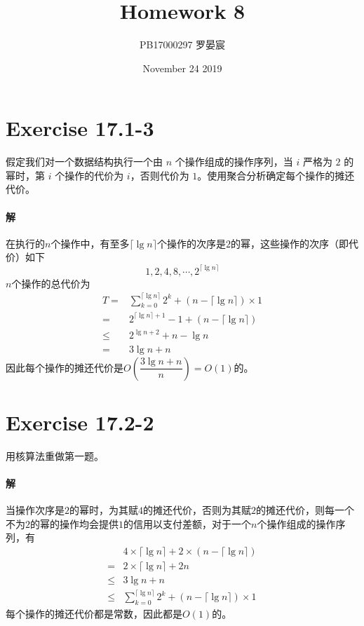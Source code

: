 \documentclass{article}
\title{Homework 8}
\author{PB17000297 罗晏宸}
\date{November 24 2019}
\begin{document}
\maketitle

\section{Exercise 17.1-3}
假定我们对一个数据结构执行一个由 $n$ 个操作组成的操作序列，当 $i$ 严格为 $2$ 的幂时，第 $i$ 个操作的代价为 $i$，否则代价为 $1$。使用聚合分析确定每个操作的摊还代价。

\paragraph{解}
在执行的$n$个操作中，有至多$\lceil \lg{n} \rceil$个操作的次序是$2$的幂，这些操作的次序（即代价）如下
\begin{equation*}
	1, 2, 4, 8, \cdots , 2^{\lceil \lg{n} \rceil}
\end{equation*}
$n$个操作的总代价为
\begin{align*}
	T =& \sum_{k = 0}^{\lceil \lg{n} \rceil}{2^k} + (n - \lceil \lg{n} \rceil) \times 1 \\
	=& 2^{\lceil \lg{n} \rceil + 1} - 1 + (n - \lceil \lg{n} \rceil) \\
	\leq & 2^{\lg{n} + 2} + n - \lg{n} \\
	=& 3\lg{n} + n
\end{align*}
因此每个操作的摊还代价是$O\left(\dfrac{3\lg{n}+n}{n}\right) = O(1)$的。

\section{Exercise 17.2-2}
用核算法重做第一题。

\paragraph{解}
当操作次序是$2$的幂时，为其赋$4$的摊还代价，否则为其赋$2$的摊还代价，则每一个不为$2$的幂的操作均会提供$1$的信用以支付差额，对于一个$n$个操作组成的操作序列，有
\begin{align*}
	& 4 \times \lceil \lg{n} \rceil + 2 \times (n - \lceil \lg{n} \rceil) \\
	=& 2 \times \lceil \lg{n} \rceil + 2n \\
	\leq & 3 \lg{n} + n \\
	\leq & \sum_{k = 0}^{\lceil \lg{n} \rceil}{2^k} + (n - \lceil \lg{n} \rceil) \times 1
\end{align*}
每个操作的摊还代价都是常数，因此都是$O(1)$的。
\end{document}

